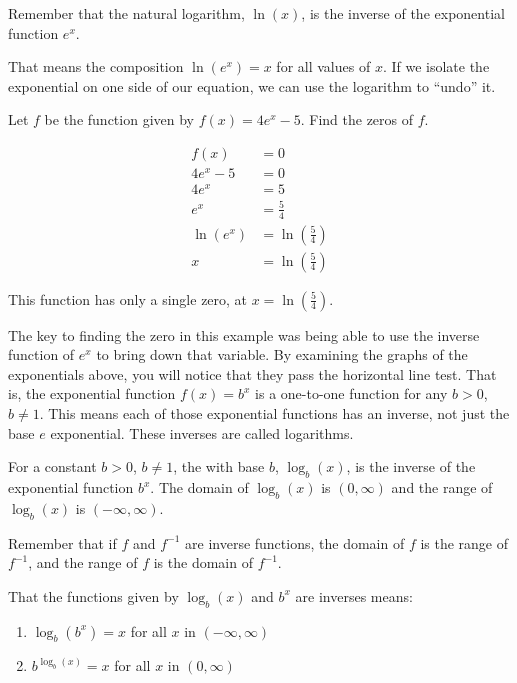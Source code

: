 \documentclass[nooutcomes]{ximera}
\begin{document}
	\begin{callout}
		Remember that the natural logarithm, $\ln(x)$, is the inverse of the exponential function $e^x$. 
	\end{callout}
		That means the composition $\ln( e^x ) = x$ for all 
		values of $x$. If we isolate the exponential on one side of our equation, we can use the logarithm to ``undo'' it.
	\begin{example}

		Let $f$ be the function given by $f(x) = 4e^x-5$. Find the zeros of $f$. 
		
		\begin{explanation}
			
			\begin{align*}
				f(x) &= 0 \\
					4e^x-5 &= 0 \\
					4e^x &= 5\\
					e^x &= \frac{5}{4}\\
					\ln(e^x) &= \ln\left( \frac{5}{4} \right)\\
					x  &= \ln\left( \frac{5}{4} \right)
			\end{align*}
			
			This function has only a single zero, at $x = \ln\left( \frac{5}{4} \right)$.
		\end{explanation}
	\end{example}
	
	The key to finding the zero in this example was being able to use the inverse function of $e^x$ to bring down that variable. By examining the graphs of 
	the exponentials above, you will notice that they pass the horizontal line test. That is, the exponential function $f(x) = b^x$ is a one-to-one function
	for any $b > 0$, $b\neq 1$. This means each of those exponential functions has an inverse, not just the base $e$ exponential. These inverses are 
	called logarithms.
	
	\begin{definition}
		For a constant $b > 0$, $b \neq 1$, the  with base $b$, $\log_b(x)$, is the inverse of the exponential function $b^x$. The domain of $\log_b(x)$ is
		$(0, \infty)$ and the range of $\log_b(x)$ is $(-\infty, \infty)$.
	\end{definition}	
		
	Remember that if $f$ and $f^{-1}$ are inverse functions, the domain of $f$ is the range of $f^{-1}$, and the range of $f$ is the domain of $f^{-1}$.
	
	That the functions given by $\log_b(x)$ and $b^x$ are inverses means:
	\begin{enumerate}
		 \item $\displaystyle \log_b( b^x ) = x$ for all  $x$ in $ (-\infty, \infty)$ \\
		 \item $\displaystyle b^{\log_b(x)} = x$ for all  $x$ in $ (0, \infty)$
	\end{enumerate}
	
\end{document}
